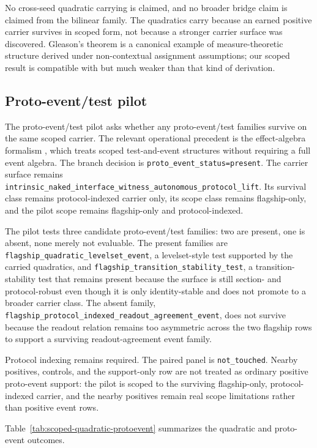 \documentclass[11pt]{article}
\theoremstyle{definition}
\begin{document}
No cross-seed quadratic carrying is claimed, and no broader bridge claim is claimed
from the bilinear family. The quadratics carry because an earned positive carrier
survives in scoped form, not because a stronger carrier surface was discovered.
Gleason's theorem \citep{Gleason1957} is a canonical example of measure-theoretic
structure derived under non-contextual assignment assumptions; our scoped result is
compatible with but much weaker than that kind of derivation.

\subsection{Proto-event/test pilot}

The proto-event/test pilot asks whether any proto-event/test families survive on the
same scoped carrier. The relevant operational precedent is the effect-algebra
formalism \citep{FoulisBennett1994}, which treats scoped test-and-event structures
without requiring a full event algebra. The branch decision is
\texttt{proto\_event\_status=present}. The carrier surface remains
\nolinkurl{intrinsic_naked_interface_witness_autonomous_protocol_lift}. Its survival
class remains protocol-indexed carrier only, its scope class remains flagship-only,
and the pilot scope remains flagship-only and protocol-indexed.

The pilot tests three candidate proto-event/test families: two are present, one is
absent, none merely not evaluable. The present families are
\nolinkurl{flagship_quadratic_levelset_event}, a levelset-style test supported by the
carried quadratics, and \nolinkurl{flagship_transition_stability_test}, a
transition-stability test that remains present because the surface is still section-
and protocol-robust even though it is only identity-stable and does not promote to a
broader carrier class. The absent family,
\nolinkurl{flagship_protocol_indexed_readout_agreement_event}, does not survive
because the readout relation remains too asymmetric across the two flagship rows to
support a surviving readout-agreement event family.

Protocol indexing remains required. The paired panel is \texttt{not\_touched}. Nearby
positives, controls, and the support-only row are not treated as ordinary positive
proto-event support: the pilot is scoped to the surviving flagship-only,
protocol-indexed carrier, and the nearby positives remain real scope limitations
rather than positive event rows.

Table~\ref{tab:scoped-quadratic-protoevent} summarizes the quadratic and proto-event
outcomes.
\end{document}
